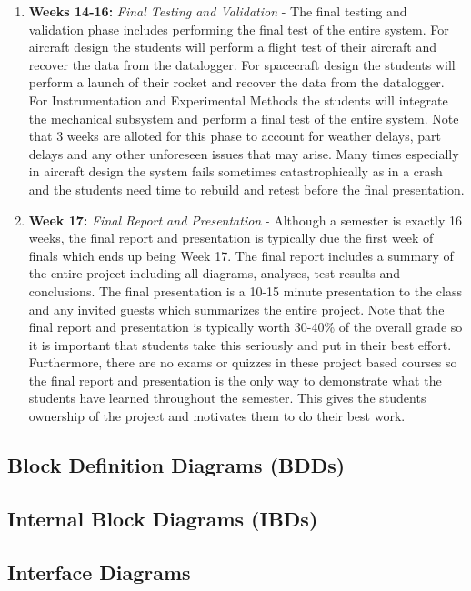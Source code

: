 \begin{enumerate}[itemsep=-5pt]
  \item {\bf Weeks 14-16:} {\it Final Testing and Validation} - The final testing and validation phase includes performing the final test of the entire system. For aircraft design the students will perform a flight test of their aircraft and recover the data from the datalogger. For spacecraft design the students will perform a launch of their rocket and recover the data from the datalogger. For Instrumentation and Experimental Methods the students will integrate the mechanical subsystem and perform a final test of the entire system. Note that 3 weeks are alloted for this phase to account for weather delays, part delays and any other unforeseen issues that may arise. Many times especially in aircraft design the system fails sometimes catastrophically as in a crash and the students need time to rebuild and retest before the final presentation.
  \item {\bf Week 17:} {\it Final Report and Presentation} - Although a semester is exactly 16 weeks, the final report and presentation is typically due the first week of finals which ends up being Week 17. The final report includes a summary of the entire project including all diagrams, analyses, test results and conclusions. The final presentation is a 10-15 minute presentation to the class and any invited guests which summarizes the entire project. Note that the final report and presentation is typically worth 30-40\% of the overall grade so it is important that students take this seriously and put in their best effort. Furthermore, there are no exams or quizzes in these project based courses so the final report and presentation is the only way to demonstrate what the students have learned throughout the semester. This gives the students ownership of the project and motivates them to do their best work.
\end{enumerate}

\subsection{Block Definition Diagrams (BDDs)}

\subsection{Internal Block Diagrams (IBDs)}

\subsection{Interface Diagrams} 

